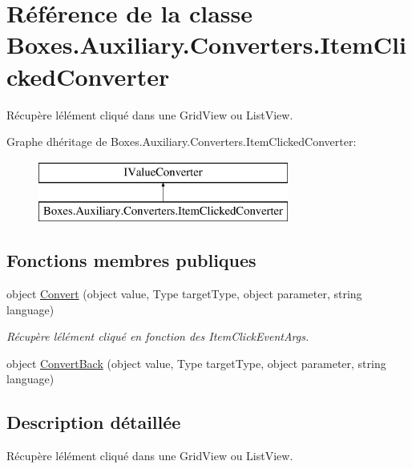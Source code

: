 \hypertarget{class_boxes_1_1_auxiliary_1_1_converters_1_1_item_clicked_converter}{}\section{Référence de la classe Boxes.\+Auxiliary.\+Converters.\+Item\+Clicked\+Converter}
\label{class_boxes_1_1_auxiliary_1_1_converters_1_1_item_clicked_converter}


Récupère l\textquotesingle{}élément cliqué dans une Grid\+View ou List\+View.  


Graphe d\textquotesingle{}héritage de Boxes.\+Auxiliary.\+Converters.\+Item\+Clicked\+Converter\+:\begin{figure}[H]
\begin{center}
\leavevmode
\includegraphics[height=2.000000cm]{class_boxes_1_1_auxiliary_1_1_converters_1_1_item_clicked_converter}
\end{center}
\end{figure}
\subsection*{Fonctions membres publiques}
\begin{DoxyCompactItemize}
\item 
object \hyperlink{class_boxes_1_1_auxiliary_1_1_converters_1_1_item_clicked_converter_a6179690743934e5b0bb6e6533b03df6a}{Convert} (object value, Type target\+Type, object parameter, string language)
\begin{DoxyCompactList}\small\item\em Récupère l\textquotesingle{}élément cliqué en fonction des Item\+Click\+Event\+Args. \end{DoxyCompactList}\item 
object \hyperlink{class_boxes_1_1_auxiliary_1_1_converters_1_1_item_clicked_converter_afd6dad80410d1a45d6dd02b0783d0ce3}{Convert\+Back} (object value, Type target\+Type, object parameter, string language)
\end{DoxyCompactItemize}


\subsection{Description détaillée}
Récupère l\textquotesingle{}élément cliqué dans une Grid\+View ou List\+View. 



